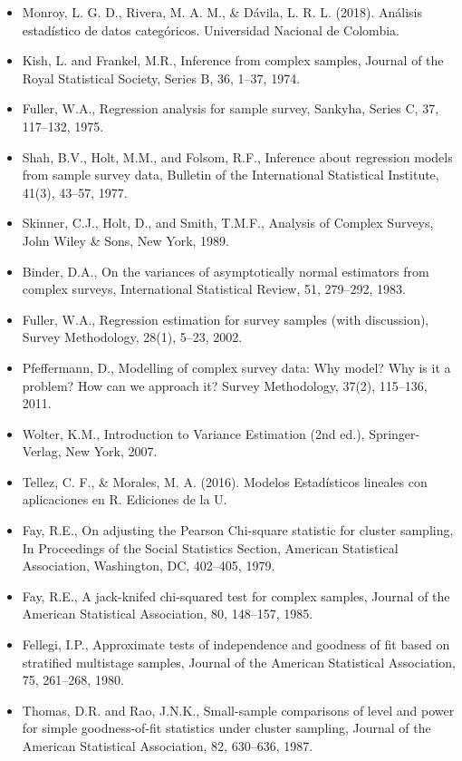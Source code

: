 \documentclass[
  spanish,
  12pt,
]{book}
\begin{document}
\begin{itemize}
\item
  Monroy, L. G. D., Rivera, M. A. M., \& Dávila, L. R. L. (2018). Análisis estadístico de datos categóricos. Universidad Nacional de Colombia.
\item
  Kish, L. and Frankel, M.R., Inference from complex samples, Journal of the Royal Statistical Society, Series B, 36, 1--37, 1974.
\item
  Fuller, W.A., Regression analysis for sample survey, Sankyha, Series C, 37, 117--132, 1975.
\item
  Shah, B.V., Holt, M.M., and Folsom, R.F., Inference about regression models from sample survey data, Bulletin of the International Statistical Institute, 41(3), 43--57, 1977.
\item
  Skinner, C.J., Holt, D., and Smith, T.M.F., Analysis of Complex Surveys, John Wiley \& Sons, New York, 1989.
\item
  Binder, D.A., On the variances of asymptotically normal estimators from complex surveys, International Statistical Review, 51, 279--292, 1983.
\item
  Fuller, W.A., Regression estimation for survey samples (with discussion), Survey Methodology, 28(1), 5--23, 2002.
\item
  Pfeffermann, D., Modelling of complex survey data: Why model? Why is it a problem? How can we approach it? Survey Methodology, 37(2), 115--136, 2011.
\item
  Wolter, K.M., Introduction to Variance Estimation (2nd ed.), Springer-Verlag, New York, 2007.
\item
  Tellez, C. F., \& Morales, M. A. (2016). Modelos Estadísticos lineales con aplicaciones en R. Ediciones de la U.
\item
  Fay, R.E., On adjusting the Pearson Chi-square statistic for cluster sampling, In Proceedings of the Social Statistics Section, American Statistical Association, Washington, DC, 402--405, 1979.
\item
  Fay, R.E., A jack-knifed chi-squared test for complex samples, Journal of the American Statistical Association, 80, 148--157, 1985.
\item
  Fellegi, I.P., Approximate tests of independence and goodness of fit based on stratified multistage samples, Journal of the American Statistical Association, 75, 261--268, 1980.
\item
  Thomas, D.R. and Rao, J.N.K., Small-sample comparisons of level and power for simple goodness-of-fit statistics under cluster sampling, Journal of the American Statistical Association, 82, 630--636, 1987.

\end{itemize}
\end{document}
